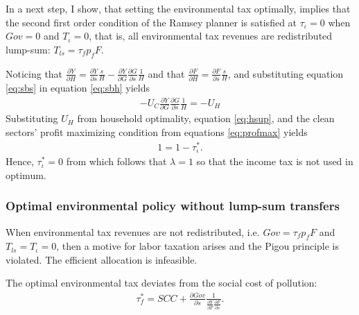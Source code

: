 In a next step, I show, that setting the environmental tax optimally, implies that the second first order condition of the Ramsey planner is satisfied at $\tau_\iota=0$ when $Gov=0$ and $T_\iota=0$, that is, all environmental tax revenues are redistributed lump-sum: $T_{ls}=\tau_{f}p_fF$.

Noticing that $\frac{\partial Y}{\partial H}= \frac{\partial Y}{\partial s}\frac{s}{H}-\frac{\partial Y}{\partial G}\frac{\partial G}{\partial s}\frac{1}{H}$ and that $\frac{\partial F}{\partial H}=\frac{\partial F}{\partial s}\frac{s}{H}$, and substituting equation \ref{eq:sbs} in equation \ref{eq:sbh} yields
\begin{align}
-U_C \frac{\partial Y}{\partial G}\frac{\partial G}{\partial s}\frac{1}{H}=-U_H
\end{align}
Substituting $U_H$ from household optimality, equation \ref{eq:hsup}, and the clean sectors' profit maximizing condition from equations \ref{eq:profmax} yields
\begin{align}
1=1-\tau^*_\iota.
\end{align}
Hence, $\tau^*_\iota =0$ from which follows that $\lambda =1$ so that the income tax is not used in optimum. 


\subsubsection{Optimal environmental policy without lump-sum transfers}
\begin{prop}
When environmental tax revenues are not redistributed, i.e. $Gov=\tau_fp_fF$ and $T_{ls}=T_\iota=0$, then a motive for labor taxation arises and the Pigou principle is violated. The efficient allocation is infeasible.  
\end{prop}
\begin{comment}
\begin{prop}\label{prop:1}
	Even if the Ramsey planner implements the efficient share of dirty production, %
	the optimal allocation is inefficient absent additional measures to reduce hours worked. Lump-sum transferring environmental tax revenues are one means to establish the efficient allocation. 
\end{prop}

content...
\end{comment}

The optimal environmental tax deviates from the social cost of pollution:
\begin{align}
\tau_{f}^*= SCC+\frac{\partial Gov}{\partial s}\frac{1}{\frac{\partial Y}{\partial F}\frac{\partial F}{\partial s}}.
\end{align}

